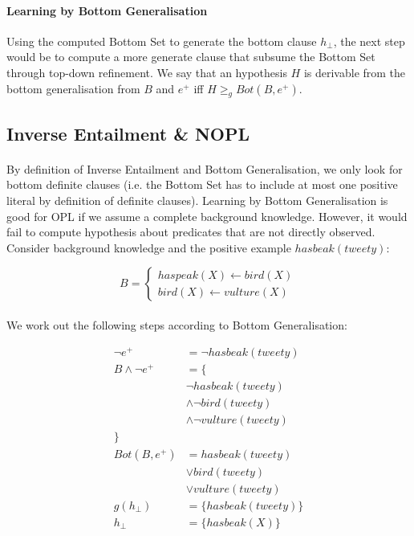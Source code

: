\documentclass{article}
\theoremstyle{plain}
\theoremstyle{definition}
\begin{document}
\begin{multicols}{2}
\paragraph{Learning by Bottom Generalisation} Using the computed Bottom Set to generate the bottom clause $h_{\perp}$, the next step would be to compute a more generate clause that subsume the Bottom Set through top-down refinement. We say that an hypothesis $H$ is derivable from the bottom generalisation from $B$ and $e^+$ iff $H \geq_g Bot(B, e^+)$. 

\subsection{Inverse Entailment \& NOPL}

\paragraph{} By definition of Inverse Entailment and Bottom Generalisation, we only look for bottom definite clauses (i.e. the Bottom Set has to include at most one positive literal by definition of definite clauses). Learning by Bottom Generalisation is good for OPL if we assume a complete background knowledge. However, it would fail to compute hypothesis about predicates that are not directly observed. Consider background knowledge and the positive example $hasbeak(tweety)$:

\[
B = \begin{cases}
haspeak(X) \leftarrow bird(X)\\
bird(X) \leftarrow vulture(X)
\end{cases}
\]

\paragraph{} We work out the following steps according to Bottom Generalisation:

\begin{align*}
\lnot e^+ &= \lnot hasbeak(tweety)\\
B \land \lnot e^+ &= \{\\
& \lnot hasbeak(tweety)\\
& \land \lnot bird(tweety) \\
& \land \lnot vulture(tweety)\\
\}&\\
Bot(B, e^+) &= hasbeak(tweety)\\
& \lor bird(tweety)\\
& \lor vulture(tweety)\\
g(h_{\perp}) &= \{ hasbeak(tweety) \}\\
h_{\perp} &= \{ hasbeak(X) \}
\end{align*}


\end{multicols}
\end{document}
